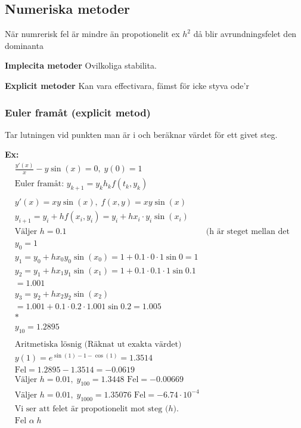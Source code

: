 \begin{multicols}{2}
\subsection{Numeriska metoder}
När numrerisk fel är mindre än propotionelit ex $h^2$ då blir avrundningsfelet den dominanta

\textbf{Implecita metoder}
Ovilkoliga stabilita.

\textbf{Explicit metoder}
Kan vara effectivara, fämst för icke styva ode'r
 
\subsubsection{Euler framåt (explicit metod)}
Tar lutningen vid punkten man är i och beräknar värdet för ett givet steg.

\textbf{Ex:}
\begin{align*}
  &\frac{y'(x)}{x} - y\sin{(x)} = 0, \; y(0)=1 \\
  &\text{Euler framåt: } y_{k+1} = y_k h_kf(t_k,y_k) \\
  &\\
  &y'(x) = xy\sin{(x)}, \; f(x,y) = xy\sin{(x)} \\
  &y_{i+1} = y_i + hf(x_i,y_i) = y_i+hx_i\cdot{y_i\sin{(x_i)}} \\
  &\text{Väljer $h=0.1$} 
  &\text{(h är steget mellan det approximerade linjerna)} \\
  &y_0 = 1 \\
  &y_1 = y_0+hx_0y_0\sin{(x_0)} = 1+0.1\cdot0\cdot1\sin{0} = 1 \\
  &y_2 = y_1+hx_1y_1\sin{(x_1)} = 1+0.1\cdot0.1\cdot1\sin{0.1} \\
  &= 1.001 \\
  &y_3 = y_2+hx_2y_2\sin{(x_2)} \\
  &= 1.001+0.1\cdot0.2\cdot1.001\sin{0.2} = 1.005 \\
  &* \\
  &y_{10} = 1.2895 \\
  &\\
  &\text{Aritmetiska lösnig (Räknat ut exakta värdet) } \\
  &y(1)=e^{\sin{(1)-1-\cos{(1)}}} = 1.3514 \\
  &\text{Fel} = 1.2895-1.3514 = -0.0619 \\
  &\text{Väljer } h=0.01, \; y_{100} = 1.3448 \text{ Fel} = -0.00669 \\
  &\text{Väljer } h=0.01, \; y_{1000} = 1.35076 \text{ Fel} = -6.74\cdot10^{-4} \\
  &\text{Vi ser att felet är propotionelit mot steg ($h$).} \\
  &\text{Fel } \alpha \; h \\
\end{align*}


\end{multicols}
